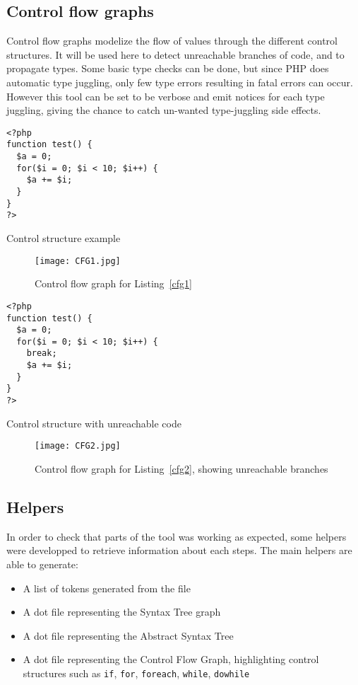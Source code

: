 \documentclass[a4paper]{article}
\begin{document}
\subsection{Control flow graphs}
Control flow graphs modelize the flow of values through the different control
structures. It will be used here to detect unreachable branches of code, and to
propagate types. Some basic type checks can be done, but since PHP does
automatic type juggling, only few type errors resulting in fatal errors can
occur. However this tool can be set to be verbose and emit notices for each
type juggling, giving the chance to catch un-wanted type-juggling side effects.

\begin{listing}
  \begin{verbatim}
<?php
function test() {
  $a = 0;
  for($i = 0; $i < 10; $i++) {
    $a += $i;
  }
}
?>
  \end{verbatim}
  \caption{Control structure example}
  \label{cfg1}
\end{listing}

\begin{figure}
  \begin{center}
  \texttt{[image: CFG1.jpg]}
  \end{center}
  \caption{Control flow graph for Listing~\ref{cfg1}}
\end{figure}

\begin{listing}
  \begin{verbatim}
<?php
function test() {
  $a = 0;
  for($i = 0; $i < 10; $i++) {
    break;
    $a += $i;
  }
}
?>
  \end{verbatim}
  \caption{Control structure with unreachable code}
  \label{cfg2}
\end{listing}

\begin{figure}
  \begin{center}
  \texttt{[image: CFG2.jpg]}
  \end{center}
  \caption{Control flow graph for Listing~\ref{cfg2}, showing unreachable branches}
\end{figure}

\subsection{Helpers}
In order to check that parts of the tool was working as expected, some helpers were
developped to retrieve information about each steps. The main helpers are able to generate:
\begin{itemize}
  \item A list of tokens generated from the file
  \item A dot file representing the Syntax Tree graph
  \item A dot file representing the Abstract Syntax Tree
  \item A dot file representing the Control Flow Graph, highlighting control structures
    such as \verb=if=, \verb=for=, \verb=foreach=, \verb=while=, \verb=dowhile=
\end{itemize}
\end{document}
